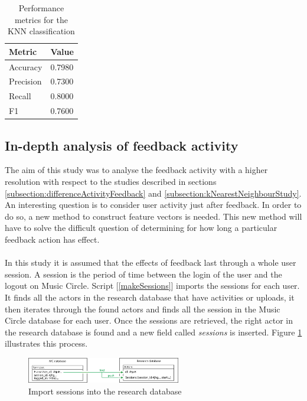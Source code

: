 \documentclass[11pt, oneside]{article}   	%
\begin{document}
\begin{table}[h!]
	\centering
	\begin{tabular}{| l | l |}
		\hline
		 \textbf{Metric} & \textbf{Value} \\ \hline
		 Accuracy & 0.7980\\ \hline
		 Precision & 0.7300 \\ \hline
		 Recall & 0.8000 \\ \hline
		 F1 & 0.7600 \\ \hline
	\end{tabular}
	\caption{Performance metrics for the KNN classification}
	\label{table:performanceMetrics}
\end{table}
\label{subsection:kNearestNeighbourStudy}
\clearpage
\subsection{In-depth analysis of feedback activity}
The aim of this study was to analyse the feedback activity with a higher resolution with respect to the studies described in sections \ref{subsection:differenceActivityFeedback} and \ref{subsection:kNearestNeighbourStudy}.\\ 
An interesting question is to consider user activity just after feedback. In order to do so, a new method to construct feature vectors is needed. This new method will have to solve the difficult question of determining for how long a particular feedback action has effect.\\\\
In this study it is assumed that the effects of feedback last through a whole user session. A session is the period of time between the login of the user and the logout on Music Circle. Script [\ref{makeSessions}] imports the sessions for each user. It finds all the actors in the research database that have activities or uploads, it then iterates through the found actors and finds all the session in the Music Circle database for each user. Once the sessions are retrieved, the right actor in the research database is found and a new field called {\it sessions} is inserted. Figure \ref{figure:sessions2} illustrates this process.
\begin{figure}[h!]
  \centering
    \includegraphics[width=0.6\textwidth]{./sessions.png}
      \caption{Import sessions into the research database}
      \label{figure:sessions2}
\end{figure}
\end{document}
